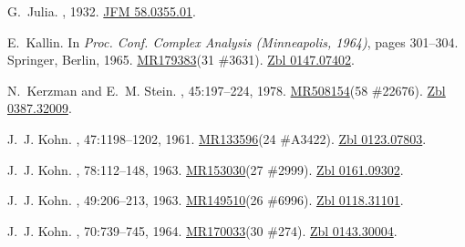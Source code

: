 \documentclass[11pt,a4paper, final, twoside]{article}
\numberwithin{equation}{section}
\begin{document}
\begin{appendices}
\begin{thebibliography}{100}
G.~Julia.
,
  1932.
\newblock \href{http://zbmath.org/?q=an:58.0355.01}{JFM 58.0355.01}.

E.~Kallin.
\newblock In {\em Proc. {C}onf. {C}omplex {A}nalysis ({M}inneapolis, 1964)},
  pages 301--304. Springer, Berlin, 1965.
\newblock \href{http://www.ams.org/mathscinet-getitem?mr=179383}{MR179383}(31
  \#3631). \href{http://zbmath.org/?q=an:0147.07402}{Zbl 0147.07402}.

N.~Kerzman and E.~M. Stein.
, 45:197--224, 1978.
\newblock \href{http://www.ams.org/mathscinet-getitem?mr=508154}{MR508154}(58
  \#22676). \href{http://zbmath.org/?q=an:0387.32009}{Zbl 0387.32009}.

J.~J. Kohn.
, 47:1198--1202, 1961.
\newblock \href{http://www.ams.org/mathscinet-getitem?mr=133596}{MR133596}(24
  \#A3422). \href{http://zbmath.org/?q=an:0123.07803}{Zbl 0123.07803}.

J.~J. Kohn.
, 78:112--148, 1963.
\newblock \href{http://www.ams.org/mathscinet-getitem?mr=153030}{MR153030}(27
  \#2999). \href{http://zbmath.org/?q=an:0161.09302}{Zbl 0161.09302}.

J.~J. Kohn.
, 49:206--213, 1963.
\newblock \href{http://www.ams.org/mathscinet-getitem?mr=149510}{MR149510}(26
  \#6996). \href{http://zbmath.org/?q=an:0118.31101}{Zbl 0118.31101}.

J.~J. Kohn.
, 70:739--745,
  1964.
\newblock \href{http://www.ams.org/mathscinet-getitem?mr=170033}{MR170033}(30
  \#274). \href{http://zbmath.org/?q=an:0143.30004}{Zbl 0143.30004}.


\end{thebibliography}
\end{appendices}
\end{document}
